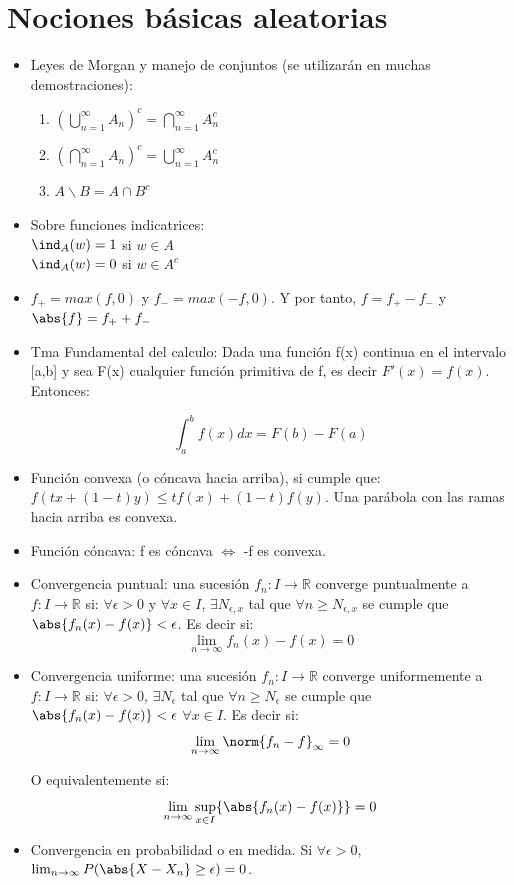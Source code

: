 \documentclass{apuntes}
\begin{document}
\section{Nociones básicas aleatorias}
\begin{itemize}
\item Leyes de Morgan y manejo de conjuntos (se utilizarán en muchas demostraciones):
\begin{enumerate}
\item $(\bigcup_{n=1}^{\infty}A_n)^c = \bigcap_{n=1}^{\infty}A_n^c$
\item $(\bigcap_{n=1}^{\infty}A_n)^c = \bigcup_{n=1}^{\infty}A_n^c$
\item $A \backslash B = A \cap B^c$

\end{enumerate}
\item Sobre funciones indicatrices:\\
$\ind_A(w)=1$ si $w \in A$\\
$\ind_A(w)=0$ si $w \in A^c$

\item $f_+ = max(f,0)$ y $f_- = max(-f,0)$. Y por tanto, $f=f_+ -f_-$ y $\abs{f}=f_+ +f_-$

\item Tma Fundamental del calculo: Dada una función f(x) continua en el intervalo [a,b] y sea F(x) cualquier función primitiva de f, es decir $F '(x) = f(x)$. Entonces:

\[
\int_a^b f(x)dx = F(b)-F(a)
\]
\item Función convexa (o cóncava hacia arriba), si cumple que: $f(tx+(1-t)y) \leq tf(x)+(1-t)f(y)$. Una parábola con las ramas hacia arriba es convexa.
\item Función cóncava: f es cóncava $\Leftrightarrow$ -f es convexa.
\item Convergencia puntual: una sucesión $f_n:I\rightarrow \mathbb{R}$ converge puntualmente a $f:I\rightarrow \mathbb{R}$ si: $\forall \epsilon >0$ y $\forall x \in I$, $\exists N_{\epsilon, x}$ tal que $\forall n \geq N_{\epsilon, x}$ se cumple que $\abs{f_n(x)-f(x)}<\epsilon$. Es decir si:
\[
\lim_{n \rightarrow \infty} f_n(x)-f(x)=0
\]

\item Convergencia uniforme: una sucesión $f_n:I\rightarrow \mathbb{R}$ converge uniformemente a $f:I\rightarrow \mathbb{R}$ si: $\forall \epsilon >0$,  $\exists N_{\epsilon}$ tal que $\forall n \geq N_{\epsilon}$ se cumple que $\abs{f_n(x)-f(x)}<\epsilon$ $\forall x \in I$. Es decir si:
\[
\lim_{n \rightarrow \infty} \norm{f_n - f}_{\infty} = 0
\]

O equivalentemente si:
\[
\lim_{n \rightarrow \infty} \sup_{x \in I}\{\abs{f_n(x)-f(x)} \}=0
\]

\item Convergencia en probabilidad o en medida. Si $\forall \epsilon >0$, $\lim_{n \rightarrow \infty}P(\abs{X-X_n}\geq \epsilon)=0$.


\end{itemize}
\end{document}
